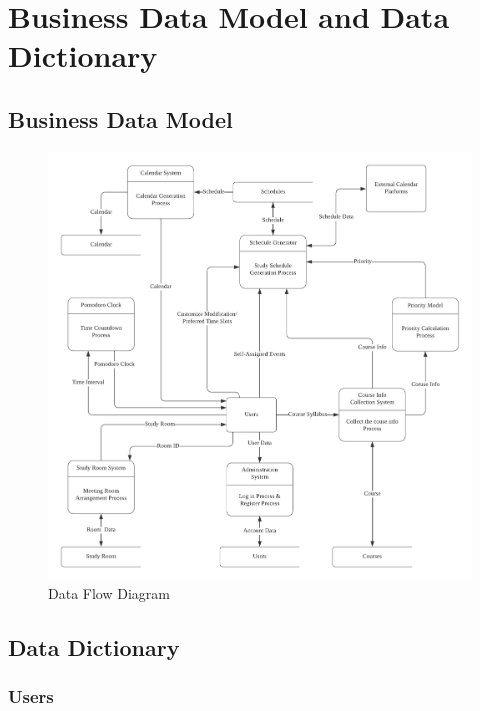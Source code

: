 \documentclass[12pt]{article}
\begin{document}
\section{Business Data Model and Data Dictionary}
\subsection{Business Data Model}
\begin{figure}[htbp]
  \centering
  \includegraphics[width=1.2\textwidth]{DFD.png}
  \caption{Data Flow Diagram} 
  \label{fig:dfd} 
\end{figure}

\subsection{Data Dictionary}
\subsubsection{Users}
\end{document}
